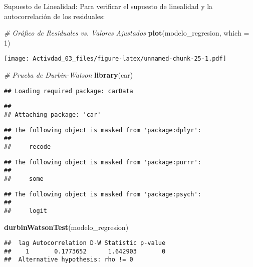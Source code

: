 \documentclass[
]{article}
\newenvironment{Shaded}{\begin{snugshade}}{\end{snugshade}}
\newcommand{\AttributeTok}[1]{\textcolor[rgb]{0.13,0.29,0.53}{#1}}
\newcommand{\CommentTok}[1]{\textcolor[rgb]{0.56,0.35,0.01}{\textit{#1}}}
\newcommand{\DecValTok}[1]{\textcolor[rgb]{0.00,0.00,0.81}{#1}}
\newcommand{\FunctionTok}[1]{\textcolor[rgb]{0.13,0.29,0.53}{\textbf{#1}}}
\newcommand{\NormalTok}[1]{#1}
\begin{document}
Supuesto de Linealidad: Para verificar el supuesto de linealidad y la
autocorrelación de los residuales:

\begin{Shaded}
\begin{Highlighting}[]
\CommentTok{\# Gráfico de Residuales vs. Valores Ajustados}
\FunctionTok{plot}\NormalTok{(modelo\_regresion, }\AttributeTok{which =} \DecValTok{1}\NormalTok{)}
\end{Highlighting}
\end{Shaded}

\texttt{[image: Activdad\_03\_files/figure-latex/unnamed-chunk-25-1.pdf]}

\begin{Shaded}
\begin{Highlighting}[]
\CommentTok{\# Prueba de Durbin{-}Watson}
\FunctionTok{library}\NormalTok{(car)}
\end{Highlighting}
\end{Shaded}

\begin{verbatim}
## Loading required package: carData
\end{verbatim}

\begin{verbatim}
## 
## Attaching package: 'car'
\end{verbatim}

\begin{verbatim}
## The following object is masked from 'package:dplyr':
## 
##     recode
\end{verbatim}

\begin{verbatim}
## The following object is masked from 'package:purrr':
## 
##     some
\end{verbatim}

\begin{verbatim}
## The following object is masked from 'package:psych':
## 
##     logit
\end{verbatim}

\begin{Shaded}
\begin{Highlighting}[]
\FunctionTok{durbinWatsonTest}\NormalTok{(modelo\_regresion)}
\end{Highlighting}
\end{Shaded}

\begin{verbatim}
##  lag Autocorrelation D-W Statistic p-value
##    1       0.1773652      1.642903       0
##  Alternative hypothesis: rho != 0
\end{verbatim}
\end{document}
